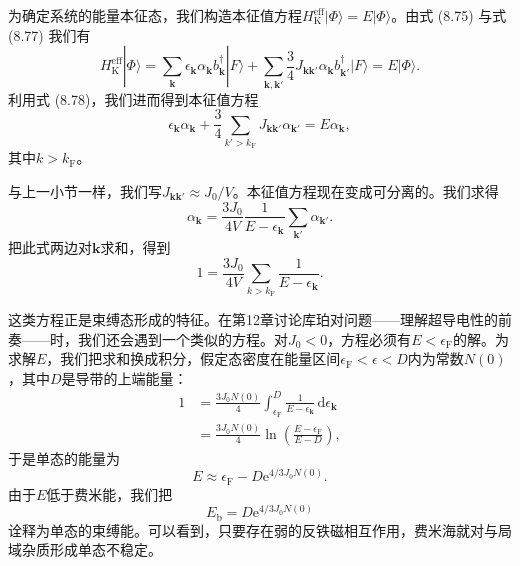 为确定系统的能量本征态，我们构造本征值方程$H_{\mathrm{K}}^{\mathrm{eff}}|\Phi\rangle=E|\Phi\rangle$。由式 (8.75) 与式 (8.77) 我们有
\begin{equation*}
H_{\mathrm{K}}^{\mathrm{eff}}|\Phi\rangle = \sum_{\mathbf{k}}\epsilon_{\mathbf{k}}\alpha_{\mathbf{k}}b_{\mathbf{k}}^{\dagger}|F\rangle+\sum_{\mathbf{k},\mathbf{k}'}\frac{3}{4}J_{\mathbf{k}\mathbf{k}'}\alpha_{\mathbf{k}}b_{\mathbf{k}'}^{\dagger}|F\rangle = E|\Phi\rangle.
\tag{8.79}
\end{equation*}
利用式 (8.78)，我们进而得到本征值方程
\begin{equation*}
\epsilon_{\mathbf{k}}\alpha_{\mathbf{k}}+\frac{3}{4}\sum_{k'>k_{\mathrm{F}}}J_{\mathbf{k}\mathbf{k}'}\alpha_{\mathbf{k}'} = E\alpha_{\mathbf{k}},
\tag{8.80}
\end{equation*}
其中$k>k_{\mathrm{F}}$。

与上一小节一样，我们写$J_{\mathbf{k}\mathbf{k}'}\approx J_0/V$。本征值方程现在变成可分离的。我们求得
\begin{equation*}
\alpha_{\mathbf{k}} = \frac{3J_0}{4V}\frac{1}{E-\epsilon_{\mathbf{k}}}\sum_{\mathbf{k}'}\alpha_{\mathbf{k}'}.
\tag{8.81}
\end{equation*}
把此式两边对$\mathbf{k}$求和，得到
\begin{equation*}
1 = \frac{3J_0}{4V}\sum_{k>k_{\mathrm{F}}}\frac{1}{E-\epsilon_{\mathbf{k}}}.
\tag{8.82}
\end{equation*}

这类方程正是束缚态形成的特征。在第12章讨论库珀对问题——理解超导电性的前奏——时，我们还会遇到一个类似的方程。对$J_0<0$，方程必须有$E<\epsilon_{\mathrm{F}}$的解。为求解$E$，我们把求和换成积分，假定态密度在能量区间$\epsilon_{\mathrm{F}}<\epsilon<D$内为常数$N(0)$，其中$D$是导带的上端能量：
\begin{equation*}
\begin{aligned}
1 &= \frac{3J_0N(0)}{4}\int_{\epsilon_{\mathrm{F}}}^{D}\frac{1}{E-\epsilon_{\mathbf{k}}}\,\mathrm{d}\epsilon_{\mathbf{k}}\\
&= \frac{3J_0N(0)}{4}\ln\left(\frac{E-\epsilon_{\mathrm{F}}}{E-D}\right),
\end{aligned}
\tag{8.83}
\end{equation*}
于是单态的能量为
\begin{equation*}
E \approx \epsilon_{\mathrm{F}} - D\mathrm{e}^{4/3J_0N(0)}.
\tag{8.84}
\end{equation*}
由于$E$低于费米能，我们把
\begin{equation*}
E_{\mathrm{b}} = D\mathrm{e}^{4/3J_0N(0)}
\tag{8.85}
\end{equation*}
诠释为单态的束缚能。可以看到，只要存在弱的反铁磁相互作用，费米海就对与局域杂质形成单态不稳定。

